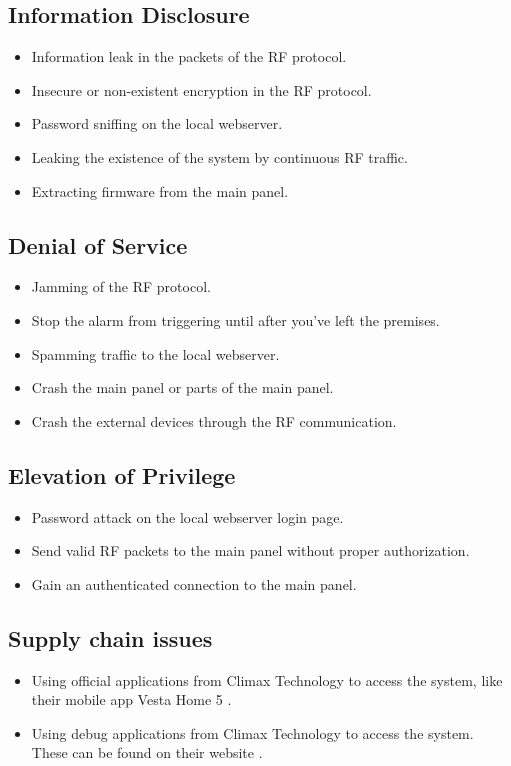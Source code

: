 \subsection{Information Disclosure}
\begin{itemize}
    \item Information leak in the packets of the \gls{RF} protocol.
    \item Insecure or non-existent encryption in the \gls{RF} protocol.
    \item Password sniffing on the local webserver.
    \item Leaking the existence of the system by continuous RF traffic.
    \item Extracting firmware from the main panel.
\end{itemize}

\subsection{Denial of Service}
\begin{itemize}
    \item Jamming of the RF protocol.
    \item Stop the alarm from triggering until after you've left the premises.
    \item Spamming traffic to the local webserver.
    \item Crash the main panel or parts of the main panel.
    \item Crash the external devices through the RF communication.
\end{itemize}

\subsection{Elevation of Privilege}
\begin{itemize}
    \item Password attack on the local webserver login page.
    \item Send valid RF packets to the main panel without proper authorization.
    \item Gain an authenticated connection to the main panel.
\end{itemize}

\subsection{Supply chain issues}
\begin{itemize}
    \item Using official applications from Climax Technology to access the system, like their mobile app Vesta Home 5 .
    \item Using debug applications from Climax Technology to access the system. These can be found on their website .
\end{itemize}
